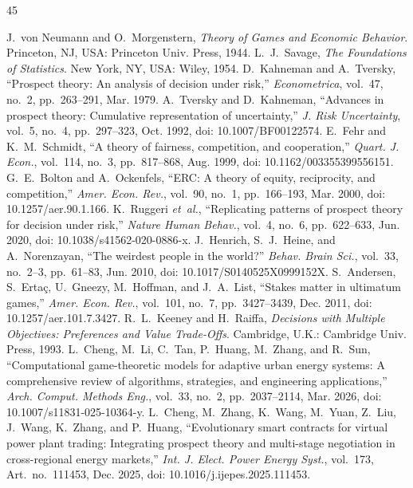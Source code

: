 \documentclass[journal]{IEEEtran}
\begin{document}
\begin{thebibliography}{45}

J.~von Neumann and O.~Morgenstern, \emph{Theory of Games and Economic Behavior}.
Princeton, NJ, USA: Princeton Univ. Press, 1944.
L.~J.~Savage, \emph{The Foundations of Statistics}.
New York, NY, USA: Wiley, 1954.
D.~Kahneman and A.~Tversky, ``Prospect theory: An analysis of decision under risk,''
\emph{Econometrica}, vol.~47, no.~2, pp.~263--291, Mar. 1979.
A.~Tversky and D.~Kahneman, ``Advances in prospect theory: Cumulative representation of uncertainty,''
\emph{J. Risk Uncertainty}, vol.~5, no.~4, pp.~297--323, Oct. 1992, doi: 10.1007/BF00122574.
E.~Fehr and K.~M.~Schmidt, ``A theory of fairness, competition, and cooperation,''
\emph{Quart. J. Econ.}, vol.~114, no.~3, pp.~817--868, Aug. 1999, doi: 10.1162/003355399556151.
G.~E.~Bolton and A.~Ockenfels, ``ERC: A theory of equity, reciprocity, and competition,''
\emph{Amer. Econ. Rev.}, vol.~90, no.~1, pp.~166--193, Mar. 2000, doi: 10.1257/aer.90.1.166.
K.~Ruggeri \emph{et~al.}, ``Replicating patterns of prospect theory for decision under risk,''
\emph{Nature Human Behav.}, vol.~4, no.~6, pp.~622--633, Jun. 2020, doi: 10.1038/s41562-020-0886-x.
J.~Henrich, S.~J.~Heine, and A.~Norenzayan, ``The weirdest people in the world?''
\emph{Behav. Brain Sci.}, vol.~33, no.~2--3, pp.~61--83, Jun. 2010, doi: 10.1017/S0140525X0999152X.
S.~Andersen, S.~Erta\c{c}, U.~Gneezy, M.~Hoffman, and J.~A.~List, ``Stakes matter in ultimatum games,''
\emph{Amer. Econ. Rev.}, vol.~101, no.~7, pp.~3427--3439, Dec. 2011, doi: 10.1257/aer.101.7.3427.
R.~L.~Keeney and H.~Raiffa, \emph{Decisions with Multiple Objectives: Preferences and Value Trade-Offs}.
Cambridge, U.K.: Cambridge Univ. Press, 1993.
L.~Cheng, M.~Li, C.~Tan, P.~Huang, M.~Zhang, and R.~Sun, ``Computational game-theoretic models for adaptive urban energy systems: A comprehensive review of algorithms, strategies, and engineering applications,''
\emph{Arch. Comput. Methods Eng.}, vol.~33, no.~2, pp.~2037--2114, Mar. 2026, doi: 10.1007/s11831-025-10364-y.
L.~Cheng, M.~Zhang, K.~Wang, M.~Yuan, Z.~Liu, J.~Wang, K.~Zhang, and P.~Huang, ``Evolutionary smart contracts for virtual power plant trading: Integrating prospect theory and multi-stage negotiation in cross-regional energy markets,''
\emph{Int. J. Elect. Power Energy Syst.}, vol.~173, Art.~no.~111453, Dec. 2025, doi: 10.1016/j.ijepes.2025.111453.

\end{thebibliography}
\end{document}
